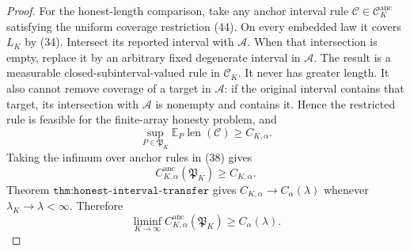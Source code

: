 \documentclass{article}
\begin{document}
\begin{proof}
For the honest-length comparison, take any anchor interval rule
\(\mathcal C\in\mathscr C_K^{\mathrm{anc}}\) satisfying the uniform
coverage restriction (44).  On every embedded law it covers \(L_K\) by
(34).  Intersect its reported interval with \(\mathcal A\).  When that
intersection is empty, replace it by an arbitrary fixed degenerate interval
in \(\mathcal A\).  The result is a measurable closed-subinterval-valued
rule in \(\mathscr C_K\).  It never has greater length.  It also cannot
remove coverage of a target in \(\mathcal A\): if the original interval
contains that target, its intersection with \(\mathcal A\) is nonempty and
contains it.  Hence the restricted rule is feasible for the finite-array
honesty problem, and
\[
 \sup_{P\in\mathfrak P_K}
 \mathbb E_P\operatorname{len}(\mathcal C)
 \geq C_{K,\alpha}.
 \tag{38}
\]
Taking the infimum over anchor rules in (38) gives
\[
 C_{K,\alpha}^{\mathrm{anc}}(\mathfrak P_K)
 \geq C_{K,\alpha}.
 \tag{39}
\]
Theorem \(\texttt{thm:honest-interval-transfer}\) gives
\(C_{K,\alpha}\to C_\alpha(\lambda)\) whenever
\(\lambda_K\to\lambda<\infty\).  Therefore
\[
 \liminf_{K\to\infty}
 C_{K,\alpha}^{\mathrm{anc}}(\mathfrak P_K)
 \geq C_\alpha(\lambda).
 \tag{40}
\]


\end{proof}
\end{document}
